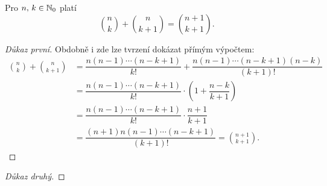 \begin{theorem}
    Pro $n,\,k\in\mathbb{N}_0$ platí
    \[\binom{n}{k}+\binom{n}{k+1}=\binom{n+1}{k+1}.\]
\end{theorem}
\begin{proof}[Důkaz první]
    Obdobně i zde lze tvrzení dokázat přímým výpočtem:
    \begin{align*}
        \binom{n}{k}+\binom{n}{k+1}&=\dfrac{n(n-1)\cdots(n-k+1)}{k!}+\dfrac{n(n-1)\cdots(n-k+1)(n-k)}{(k+1)!}\\ &=\dfrac{n(n-1)\cdots(n-k+1)}{k!}\cdot\left(1+\dfrac{n-k}{k+1}\right)\\ &=\dfrac{n(n-1)\cdots(n-k+1)}{k!}\cdot\dfrac{n+1}{k+1}\\ &=\dfrac{(n+1)n(n-1)\cdots(n-k+1)}{(k+1)!}=\binom{n+1}{k+1}.
    \end{align*}
\end{proof}
\begin{proof}[Důkaz druhý]
    
\end{proof}